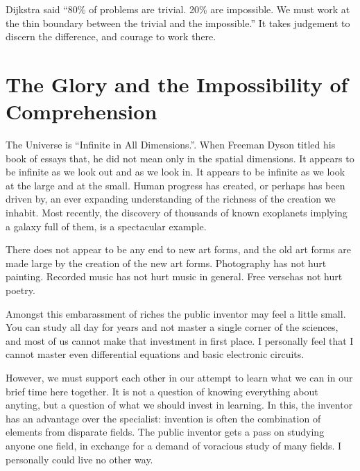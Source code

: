 \documentclass[
	fontsize=10pt, %
	twoside=false, %
	secnumdepth=1, %
]{kaobook}
\begin{document}
Dijkstra said ``80\% of problems are trivial. 20\% are impossible. We must work at the thin boundary between the trivial and the impossible.''
It takes judgement to discern the difference, and courage to work there.


\section{The Glory and the Impossibility of Comprehension}

The Universe is ``Infinite in All Dimensions.''\cite{Dyson1989}.
When Freeman Dyson titled his book of essays that, he did not mean
only in the spatial dimensions.
It appears to be infinite as we look out and as we look in.
It appears to be infinite as we look at the large and at the small.
Human progress has created, or perhaps has been driven by,
an ever expanding understanding of the richness of the creation
we inhabit. Most recently, the discovery of thousands of known
exoplanets implying a galaxy full of them, is a spectacular example.

There does not appear to be any end to new art forms, and the
old art forms are made large by the creation of the new art forms.
Photography has not hurt painting.
Recorded music has not hurt music in general.
Free versehas not hurt poetry.

Amongst this embarassment of riches the public inventor
may feel a little small.
You can study all day for years and not master a single corner
of the sciences, and most of us cannot make that investment in
first place.
I personally feel that I cannot master even differential equations
and basic electronic circuits.

However, we must support each other in our attempt to learn what we can
in our brief time here together. It is not a question of knowing everything
about anyting, but a question of what we should invest in learning.
In this, the inventor has an advantage over the specialist:
invention is often the combination of elements from disparate fields.
The public inventor gets a pass on studying anyone one field,
in exchange for a demand of voracious study of many fields.
I personally could live no other way.
\end{document}
